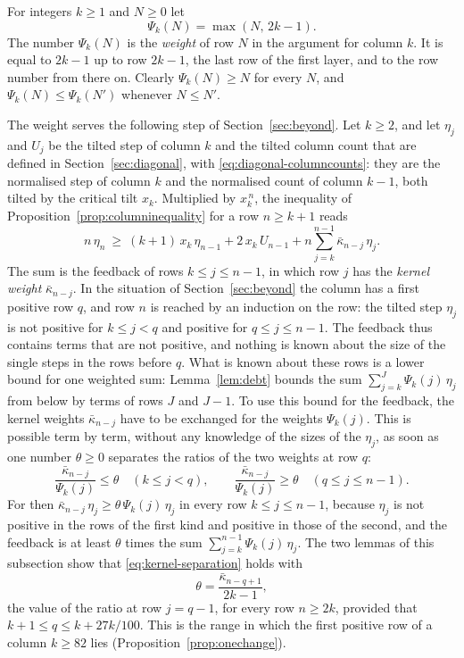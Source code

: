 \documentclass{amsart}
\theoremstyle{definition}
\theoremstyle{remark}
\numberwithin{equation}{section}
\begin{document}
For integers $k\ge1$ and $N\ge0$ let
\[
\Psi_k(N)=\max(N,\,2k-1).
\]
The number $\Psi_k(N)$ is the \emph{weight} of row $N$ in the argument for
column $k$. It is equal to $2k-1$ up to row $2k-1$,
the last row of the first layer, and to the row number from there on.
Clearly $\Psi_k(N)\ge N$ for every $N$, and $\Psi_k(N)\le\Psi_k(N')$
whenever $N\le N'$.

The weight serves the following step of Section~\ref{sec:beyond}. Let
$k\ge2$, and let $\eta_j$ and $U_j$ be the tilted step of column $k$ and
the tilted column count that are defined in Section~\ref{sec:diagonal},
with \eqref{eq:diagonal-columncounts}: they are the normalised step of
column $k$ and the normalised count of column $k-1$, both tilted by the
critical tilt $x_k$.
Multiplied by $x_k^{\,n}$, the inequality of
Proposition~\ref{prop:columninequality} for a row $n\ge k+1$ reads
\[
n\,\eta_n\ \ge\ (k+1)\,x_k\,\eta_{n-1}+2\,x_k\,U_{n-1}
+n\sum_{j=k}^{n-1}\bar\kappa_{n-j}\,\eta_j .
\]
The sum is the feedback of rows $k\le j\le n-1$, in which row $j$ has the
\emph{kernel weight} $\bar\kappa_{n-j}$.
In the situation of Section~\ref{sec:beyond} the column has a first positive
row $q$, and row $n$ is reached by an induction on the row: the tilted
step $\eta_j$ is not positive for $k\le j<q$ and positive for
$q\le j\le n-1$. The feedback thus contains terms that are not positive, and
nothing is known about the size of the single steps in the rows before $q$.
What is known about these rows is a lower bound for one weighted sum:
Lemma~\ref{lem:debt} bounds the sum $\sum_{j=k}^{J}\Psi_k(j)\,\eta_j$ from
below by terms of rows $J$ and $J-1$. To use this bound for the
feedback, the kernel weights $\bar\kappa_{n-j}$ have to be exchanged for the
weights $\Psi_k(j)$. This is possible term by term, without any knowledge
of the sizes of the $\eta_j$, as soon as one number $\theta\ge0$ separates
the ratios of the two weights at row $q$:
\begin{equation}\label{eq:kernel-separation}
\frac{\bar\kappa_{n-j}}{\Psi_k(j)}\le\theta\quad(k\le j<q),\qquad
\frac{\bar\kappa_{n-j}}{\Psi_k(j)}\ge\theta\quad(q\le j\le n-1).
\end{equation}
For then $\bar\kappa_{n-j}\,\eta_j\ge\theta\,\Psi_k(j)\,\eta_j$ in every row
$k\le j\le n-1$, because $\eta_j$ is not positive in the rows of the first
kind and positive in those of the second, and the feedback is at least
$\theta$ times the sum $\sum_{j=k}^{n-1}\Psi_k(j)\,\eta_j$.
The two lemmas of this
subsection show that \eqref{eq:kernel-separation} holds with
\[
\theta=\frac{\bar\kappa_{n-q+1}}{2k-1},
\]
the value of the ratio at row $j=q-1$, for every row $n\ge2k$, provided
that $k+1\le q\le k+27k/100$. This is the range in which the first positive
row of a column $k\ge82$ lies (Proposition~\ref{prop:onechange}).
\end{document}
